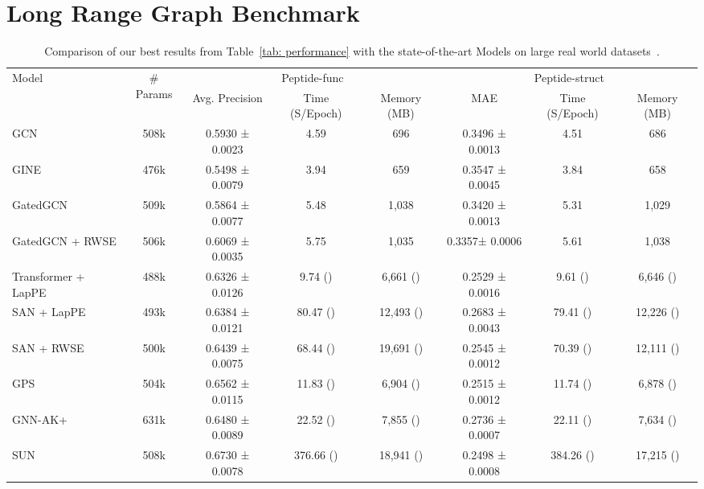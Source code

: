 \documentclass{article}
\begin{document}
\section{Long Range Graph Benchmark}\label{app sec: lrgb}
\begin{table}[!ht]
    \caption{Comparison of our best results from Table~\ref{tab: performance} with the state-of-the-art Models on large real world datasets~\citep{dwivedi2022long}.}
\scriptsize
    \centering
    \begin{tabular}{lccccccc}
    \toprule
         \multirow{2}{*}{Model} & \multirow{2}{*}{\# Params}
         &  \multicolumn{3}{c}{Peptide-func}
         &  \multicolumn{3}{c}{Peptide-struct} \\
         \cmidrule(lr){3-5} \cmidrule(lr){6-8}
         & & Avg. Precision   & Time (S/Epoch) & Memory (MB)
         & MAE  & Time (S/Epoch) & Memory (MB)\\
         \midrule
         GCN & 508k
         & 0.5930 ± 0.0023 & 4.59 & 696
         & 0.3496 ± 0.0013 & 4.51 & 686\\
         GINE & 476k 
         & 0.5498 ± 0.0079 & 3.94 & 659
         & 0.3547 ± 0.0045 & 3.84 & 658 \\
         GatedGCN & 509k 
         & 0.5864 ± 0.0077 & 5.48 & 1,038
         & 0.3420 ± 0.0013 & 5.31 & 1,029\\
         GatedGCN + RWSE  & 506k 
         & 0.6069 ± 0.0035 & 5.75 & 1,035
         & 0.3357±  0.0006 & 5.61 & 1,038\\
         \midrule
         Transformer + LapPE & 488k 
         & 0.6326 ± 0.0126 & 9.74 () & 6,661 ()
         & 0.2529 ± 0.0016 & 9.61 () & 6,646 ()\\
         SAN + LapPE~\citep{chen2022structure_SAT} & 493k 
         & 0.6384 ± 0.0121 & 80.47 () & 12,493 () 
         & 0.2683 ± 0.0043 & 79.41 () &  12,226 ()\\
         SAN + RWSE~\citep{chen2022structure_SAT} & 500k 
         & 0.6439 ± 0.0075 & 68.44 () & 19,691 ()
         & 0.2545 ± 0.0012 & 70.39 () &12,111 ()\\
         GPS~\citep{rampavsek2022recipe} & 504k
         & 0.6562 ± 0.0115 & 11.83 () & 6,904 ()
         & 0.2515 ± 0.0012 & 11.74 ()& 6,878 ()\\
         
         \midrule
         GNN-AK+~\citep{zhao2021stars} & 631k
         &  0.6480 ± 0.0089 & 22.52 () & 7,855 ()
         & 0.2736 ± 0.0007  & 22.11 () & 7,634 ()\\
         SUN~\citep{sun} & 508k
         & 0.6730 ± 0.0078 & 376.66 () & 18,941 ()
         & 0.2498 ± 0.0008 &  384.26 ()& 17,215 ()\\
         

\end{tabular}
\end{table}
\end{document}
